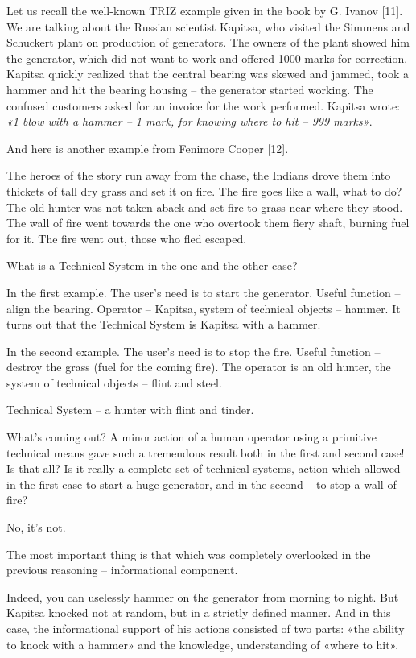 \documentclass[11pt,a4paper]{article}
\begin{document}
Let us recall the well-known TRIZ example given in the book by G. Ivanov [11].
We are talking about the Russian scientist Kapitsa, who visited the Simmens
and Schuckert plant on production of generators. The owners of the plant
showed him the generator, which did not want to work and offered 1000 marks
for correction. Kapitsa quickly realized that the central bearing was skewed
and jammed, took a hammer and hit the bearing housing -- the generator started
working.  The confused customers asked for an invoice for the work performed.
Kapitsa wrote: \emph{«1 blow with a hammer -- 1 mark, for knowing where to hit
  -- 999 marks»}.

And here is another example from Fenimore Cooper [12].

The heroes of the story run away from the chase, the Indians drove them into
thickets of tall dry grass and set it on fire. The fire goes like a wall, what
to do? The old hunter was not taken aback and set fire to grass near where
they stood. The wall of fire went towards the one who overtook them fiery
shaft, burning fuel for it. The fire went out, those who fled escaped.

What is a Technical System in the one and the other case?

In the first example. The user's need is to start the generator. Useful
function -- align the bearing. Operator -- Kapitsa, system of technical
objects -- hammer.  It turns out that the Technical System is Kapitsa with a
hammer.

In the second example. The user's need is to stop the fire. Useful function --
destroy the grass (fuel for the coming fire). The operator is an old hunter,
the system of technical objects -- flint and steel.

Technical System -- a hunter with flint and tinder.

What's coming out? A minor action of a human operator using a primitive
technical means gave such a tremendous result both in the first and second
case! Is that all? Is it really a complete set of technical systems, action
which allowed in the first case to start a huge generator, and in the second
-- to stop a wall of fire?

No, it’s not.

The most important thing is that which was completely overlooked in the
previous reasoning -- informational component.

Indeed, you can uselessly hammer on the generator from morning to night. But
Kapitsa knocked not at random, but in a strictly defined manner. And in this
case, the informational support of his actions consisted of two parts: «the
ability to knock with a hammer» and the knowledge, understanding of «where to
hit».
\end{document}
